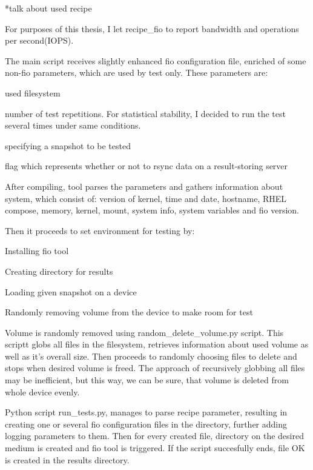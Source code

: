 \documentclass[
  color, %
  table, %
  lof,   %
  lot,   %
]{fithesis3}
\begin{document}
*talk about used recipe

For purposes of this thesis, I let recipe\_fio to report bandwidth and operations per second(IOPS).

The main script receives slightly enhanced fio configuration file, enriched of some non-fio parameters, which are used by test only. These parameters are:
\begin{compactenum}
  \item used filesystem
  \item number of test repetitions. For statistical stability, I decided to run the test several times under same conditions.
  \item specifying a snapshot to be tested
  \item flag which represents whether or not to rsync data on a result-storing server
  \end{compactenum}

After compiling, tool parses the parameters and gathers information about system, which consist of: version of kernel, time and date, hostname, RHEL compose, memory, kernel, mount, system info, system variables and fio version.

Then it proceeds to set environment for testing by:

\begin{compactenum}
  \item Installing fio tool
  \item Creating directory for results
  \item Loading given snapshot on a device
  \item Randomly removing volume from the device to make room for test
\end{compactenum}

Volume is randomly removed using random\_delete\_volume.py script. This scriptt globs all files in the filesystem, retrieves information about used volume as well as it's overall size. Then proceeds to randomly choosing files to delete and stops when desired volume is freed. The approach of recursively globbing all files may be inefficient, but this way, we can be sure, that volume is deleted from whole device evenly.

Python script run\_tests.py, manages to parse recipe parameter, resulting in creating one or several fio configuration files in the directory, further adding logging parameters to them. Then for every created file, directory on the desired medium is created and fio tool is triggered. If the script succesfully ends, file OK is created in the results directory.
\end{document}
